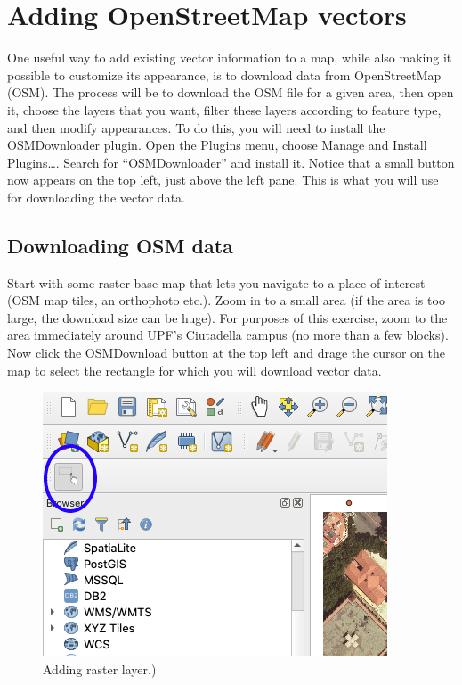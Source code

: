 \documentclass[]{book}
\begin{document}
\hypertarget{osm-vectors}{%
\chapter{Adding OpenStreetMap vectors}\label{osm-vectors}}

One useful way to add existing vector information to a map, while also making it possible to customize its appearance, is to download data from OpenStreetMap (OSM). The process will be to download the OSM file for a given area, then open it, choose the layers that you want, filter these layers according to feature type, and then modify appearances. To do this, you will need to install the OSMDownloader plugin. Open the Plugins menu, choose Manage and Install Plugins\ldots{}. Search for ``OSMDownloader'' and install it. Notice that a small button now appears on the top left, just above the left pane. This is what you will use for downloading the vector data.

\hypertarget{downloading-osm-data}{%
\section{Downloading OSM data}\label{downloading-osm-data}}

Start with some raster base map that lets you navigate to a place of interest (OSM map tiles, an orthophoto etc.). Zoom in to a small area (if the area is too large, the download size can be huge). For purposes of this exercise, zoom to the area immediately around UPF's Ciutadella campus (no more than a few blocks). Now click the OSMDownload button at the top left and drage the cursor on the map to select the rectangle for which you will download vector data.

\begin{figure}
\centering
\includegraphics{images/osmdownloader_button.png}
\caption{Adding raster layer.)}
\end{figure}
\end{document}
